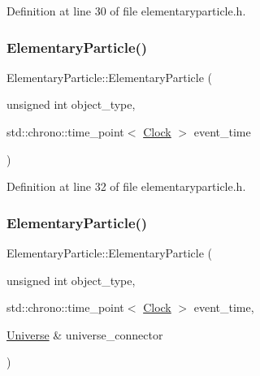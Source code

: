Definition at line 30 of file elementaryparticle.\+h.

\mbox{\label{class_elementary_particle_a371e2742ab8b5ce0fe55ef4adbaed3af}} 
\subsubsection{\texorpdfstring{Elementary\+Particle()}{ElementaryParticle()}\hspace{0.1cm}{\footnotesize\ttfamily [3/4]}}
{\footnotesize\ttfamily Elementary\+Particle\+::\+Elementary\+Particle (\begin{DoxyParamCaption}\item[{unsigned int}]{object\+\_\+type,  }\item[{std\+::chrono\+::time\+\_\+point$<$ \hyperlink{universe_8h_a0ef8d951d1ca5ab3cfaf7ab4c7a6fd80}{Clock} $>$}]{event\+\_\+time }\end{DoxyParamCaption})\hspace{0.3cm}{\ttfamily [inline]}}



Definition at line 32 of file elementaryparticle.\+h.

\mbox{\label{class_elementary_particle_a0b43033247b36096d0de2a7553c620a9}} 
\subsubsection{\texorpdfstring{Elementary\+Particle()}{ElementaryParticle()}\hspace{0.1cm}{\footnotesize\ttfamily [4/4]}}
{\footnotesize\ttfamily Elementary\+Particle\+::\+Elementary\+Particle (\begin{DoxyParamCaption}\item[{unsigned int}]{object\+\_\+type,  }\item[{std\+::chrono\+::time\+\_\+point$<$ \hyperlink{universe_8h_a0ef8d951d1ca5ab3cfaf7ab4c7a6fd80}{Clock} $>$}]{event\+\_\+time,  }\item[{\hyperlink{class_universe}{Universe} \&}]{universe\+\_\+connector }\end{DoxyParamCaption})\hspace{0.3cm}{\ttfamily [inline]}}



